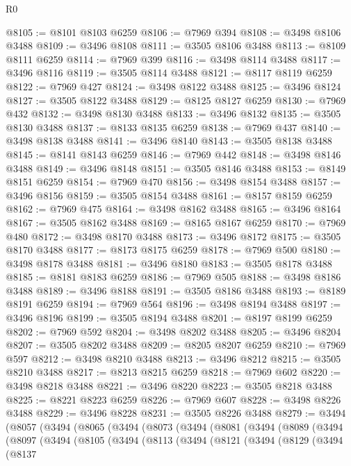 \begin{lexlean}{R0}
\begin{coremodule}
@8105 := @8101 @8103 @6259
@8106 := @7969 @394
@8108 := @3498 @8106 @3488
@8109 := @3496 @8108
@8111 := @3505 @8106 @3488
@8113 := @8109 @8111 @6259
@8114 := @7969 @399
@8116 := @3498 @8114 @3488
@8117 := @3496 @8116
@8119 := @3505 @8114 @3488
@8121 := @8117 @8119 @6259
@8122 := @7969 @427
@8124 := @3498 @8122 @3488
@8125 := @3496 @8124
@8127 := @3505 @8122 @3488
@8129 := @8125 @8127 @6259
@8130 := @7969 @432
@8132 := @3498 @8130 @3488
@8133 := @3496 @8132
@8135 := @3505 @8130 @3488
@8137 := @8133 @8135 @6259
@8138 := @7969 @437
@8140 := @3498 @8138 @3488
@8141 := @3496 @8140
@8143 := @3505 @8138 @3488
@8145 := @8141 @8143 @6259
@8146 := @7969 @442
@8148 := @3498 @8146 @3488
@8149 := @3496 @8148
@8151 := @3505 @8146 @3488
@8153 := @8149 @8151 @6259
@8154 := @7969 @470
@8156 := @3498 @8154 @3488
@8157 := @3496 @8156
@8159 := @3505 @8154 @3488
@8161 := @8157 @8159 @6259
@8162 := @7969 @475
@8164 := @3498 @8162 @3488
@8165 := @3496 @8164
@8167 := @3505 @8162 @3488
@8169 := @8165 @8167 @6259
@8170 := @7969 @480
@8172 := @3498 @8170 @3488
@8173 := @3496 @8172
@8175 := @3505 @8170 @3488
@8177 := @8173 @8175 @6259
@8178 := @7969 @500
@8180 := @3498 @8178 @3488
@8181 := @3496 @8180
@8183 := @3505 @8178 @3488
@8185 := @8181 @8183 @6259
@8186 := @7969 @505
@8188 := @3498 @8186 @3488
@8189 := @3496 @8188
@8191 := @3505 @8186 @3488
@8193 := @8189 @8191 @6259
@8194 := @7969 @564
@8196 := @3498 @8194 @3488
@8197 := @3496 @8196
@8199 := @3505 @8194 @3488
@8201 := @8197 @8199 @6259
@8202 := @7969 @592
@8204 := @3498 @8202 @3488
@8205 := @3496 @8204
@8207 := @3505 @8202 @3488
@8209 := @8205 @8207 @6259
@8210 := @7969 @597
@8212 := @3498 @8210 @3488
@8213 := @3496 @8212
@8215 := @3505 @8210 @3488
@8217 := @8213 @8215 @6259
@8218 := @7969 @602
@8220 := @3498 @8218 @3488
@8221 := @3496 @8220
@8223 := @3505 @8218 @3488
@8225 := @8221 @8223 @6259
@8226 := @7969 @607
@8228 := @3498 @8226 @3488
@8229 := @3496 @8228
@8231 := @3505 @8226 @3488
@8279 := @3494
    (@8057
      (@3494
        (@8065
          (@3494
            (@8073
              (@3494
                (@8081
                  (@3494
                    (@8089
                      (@3494
                        (@8097
                          (@3494
                            (@8105
                              (@3494
                                (@8113
                                  (@3494
                                    (@8121
                                      (@3494
                                        (@8129
                                          (@3494
                                            (@8137

\end{coremodule}
\end{lexlean}
